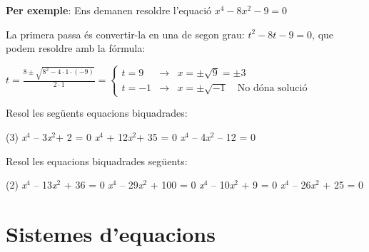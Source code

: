  

\begin{example}

 \textbf{Per exemple}: Ens demanen resoldre l'equació $x^4-8x^2-9=0$
 
 La primera passa és convertir-la en una de segon grau:  $t^2-8t-9=0$, que podem resoldre amb la fórmula:
 
  $t=\frac{8\pm \sqrt{8^2-4\cdot1\cdot(-9)}}{2\cdot1}=\left\{ \begin{array}{lcl}
  t=9  &\rightarrow& x=\pm \sqrt{9} = \pm 3 \\
  t=-1 &\rightarrow& x=\pm \sqrt{-1} \quad \text{No dóna solució} 
  \end{array} \right.$
\end{example}

\begin{mylist}
	\exer[1]  Resol les següents equacions biquadrades:

\begin{tasks}(3)
	\task  \textit{x}${}^{4}$ -- 3\textit{x}${}^{2 }$+ 2 = 0   
	\task  \textit{x}${}^{4}$ + 12\textit{x}${}^{2 }$+ 35 = 0   
	\task  \textit{x}${}^{4}$ -- 4\textit{x}${}^{2}$ -- 12 = 0
\end{tasks}
\answers[cols=1]{[$x=\pm 1$ i $x=\pm \sqrt{2}$, S.S., $x=\pm \sqrt{6}$]}

\exer  Resol les equacions biquadrades següents:

\begin{tasks}(2)
	\task  \textit{x}${}^{4}$ -- 13\textit{x}${}^{2}$ + 36 = 0  
	\task  \textit{x}${}^{4}$ -- 29\textit{x}${}^{2}$ + 100 = 0   
	\task  \textit{x}${}^{4}$ -- 10\textit{x}${}^{2}$ + 9 = 0  
	\task  \textit{x}${}^{4}$ -- 26\textit{x}${}^{2}$ + 25 = 0
\end{tasks}
\answers[cols=1]{[$x=\pm 2$ i $x=\pm 3$, $x=\pm 2$ i $x=\pm 5$, $x=\pm 1$ i $x=\pm 3$, $x=\pm 1$ i $x=\pm 5$]}

\end{mylist}

 
\section{Sistemes d'equacions}

